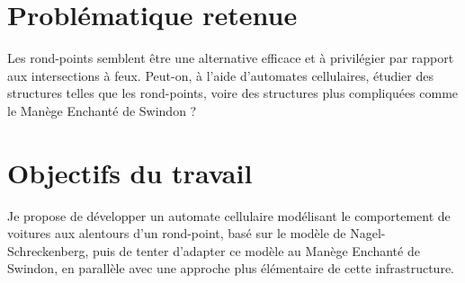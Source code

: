 \documentclass[11pt,a4paper,french]{article}
\begin{document}
\section*{Problématique retenue}

Les rond-points semblent être une alternative efficace et à privilégier par rapport aux intersections à feux.
Peut-on, à l'aide d'automates cellulaires, étudier des structures telles que les rond-points, voire des structures plus compliquées comme le Manège Enchanté de Swindon ?

\section*{Objectifs du travail}
Je propose de développer un automate cellulaire modélisant le comportement de voitures aux alentours d'un rond-point, basé sur le modèle de Nagel-Schreckenberg, puis de tenter d'adapter ce modèle au Manège Enchanté de Swindon, en parallèle avec une approche plus élémentaire de cette infrastructure.\par


\renewcommand{\refname}{Bibliographie}


\end{document}
